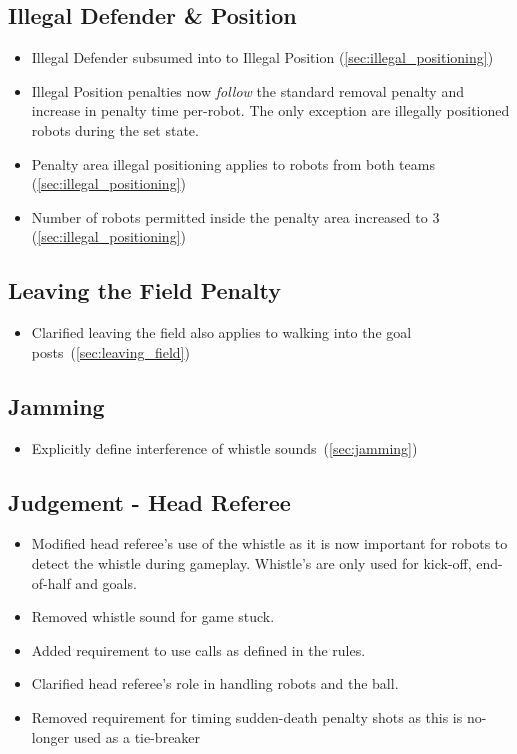 \subsection*{Illegal Defender \& Position}
\begin{itemize}
  \item Illegal Defender subsumed into to Illegal Position (\cf \cref{sec:illegal_positioning})
  \item Illegal Position penalties now \textit{follow} the standard removal penalty and increase in penalty time per-robot. The only exception are illegally positioned robots during the set state.
  \item Penalty area illegal positioning applies to robots from both teams (\cf \cref{sec:illegal_positioning})
  \item Number of robots permitted inside the penalty area increased to 3 (\cf \cref{sec:illegal_positioning})
\end{itemize}

\subsection*{Leaving the Field Penalty}
\begin{itemize}
  \item Clarified leaving the field also applies to walking into the goal posts~(\cf \cref{sec:leaving_field})
\end{itemize}

\subsection*{Jamming}
\begin{itemize}
  \item Explicitly define interference of whistle sounds~(\cf \cref{sec:jamming})
\end{itemize}

\subsection*{Judgement - Head Referee}
\begin{itemize}
  \item Modified head referee's use of the whistle as it is now important for robots to detect the whistle during gameplay. Whistle's are only used for kick-off, end-of-half and goals.
  \item Removed whistle sound for game stuck.
  \item Added requirement to use calls as defined in the rules.
  \item Clarified head referee's role in handling robots and the ball.
  \item Removed requirement for timing sudden-death penalty shots as this is no-longer used as a tie-breaker
\end{itemize}


